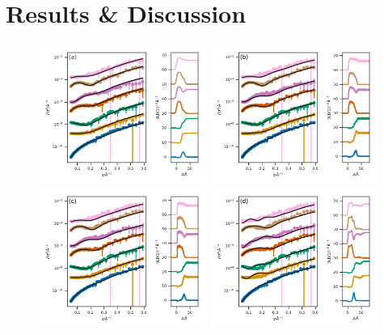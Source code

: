 \documentclass[amsmath,amssymb,twocolumn,superscriptaddress]{revtex4-1}
\begin{document}
\section{Results \& Discussion}
%
\begin{figure}
 \centering
 \includegraphics[width=0.49\textwidth]{dspc_30_ref_sld}
 \includegraphics[width=0.49\textwidth]{dspc_slipids_30_ref_sld} \\
 \includegraphics[width=0.49\textwidth]{dspc_berger_30_ref_sld}
 \includegraphics[width=0.49\textwidth]{dspc_martini_30_ref_sld}

\end{figure}
\end{document}
